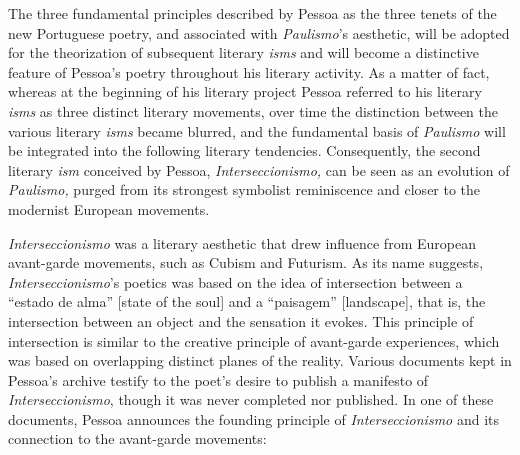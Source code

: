 \documentclass{article}
\begin{document}
The three fundamental principles described by Pessoa as the three tenets
of the new Portuguese poetry, and associated with \emph{Paulismo}'s
aesthetic, will be adopted for the theorization of subsequent literary
\emph{isms} and will become a distinctive feature of Pessoa's poetry
throughout his literary activity. As a matter of fact, whereas at the
beginning of his literary project Pessoa referred to his literary
\emph{isms} as three distinct literary movements, over time the
distinction between the various literary \emph{isms} became blurred, and
the fundamental basis of \emph{Paulismo} will be integrated into the
following literary tendencies. Consequently, the second literary
\emph{ism} conceived by Pessoa, \emph{Interseccionismo,} can be seen as
an evolution of \emph{Paulismo,} purged from its strongest symbolist
reminiscence and closer to the modernist European movements.

\emph{Interseccionismo} was a literary aesthetic that drew influence
from European avant-garde movements, such as Cubism and Futurism. As its
name suggests, \emph{Interseccionismo}'s poetics was based on the idea
of intersection between a ``estado de alma'' [state of the soul] and
a ``paisagem'' [landscape], that is, the intersection between an
object and the sensation it evokes. This principle of intersection is
similar to the creative principle of avant-garde experiences, which was
based on overlapping distinct planes of the reality. Various documents
kept in Pessoa's archive testify to the poet's desire to publish a
manifesto of \emph{Interseccionismo}, though it was never completed nor
published. In one of these documents, Pessoa announces the founding
principle of \emph{Interseccionismo} and its connection to the
avant-garde movements:
\end{document}
